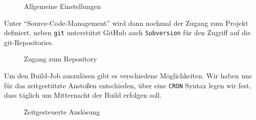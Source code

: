 \begin{figure}
\caption{Allgemeine Einstellungen}\label{fig:NewJob}
\end{figure}


Unter \enquote{Source-Code-Management} wird dann nochmal der Zugang zum Projekt definiert, neben \texttt{git} unterstützt GitHub auch \texttt{Subversion} für den Zugriff auf die git-Repositories.


\begin{figure}
\caption{Zugang zum Repository}\label{fig:NewJob}
\end{figure}

Um den Build-Job auszulösen gibt es verschiedene Möglichkeiten. Wir haben uns für das zeitgestützte Anstoßen entschieden, über eine \texttt{CRON} Syntax legen wir fest, dass täglich um Mitternacht der Build erfolgen soll. 


\begin{figure}
\caption{Zeitgesteuerte Auslösung}\label{fig:NewJob}
\end{figure}


